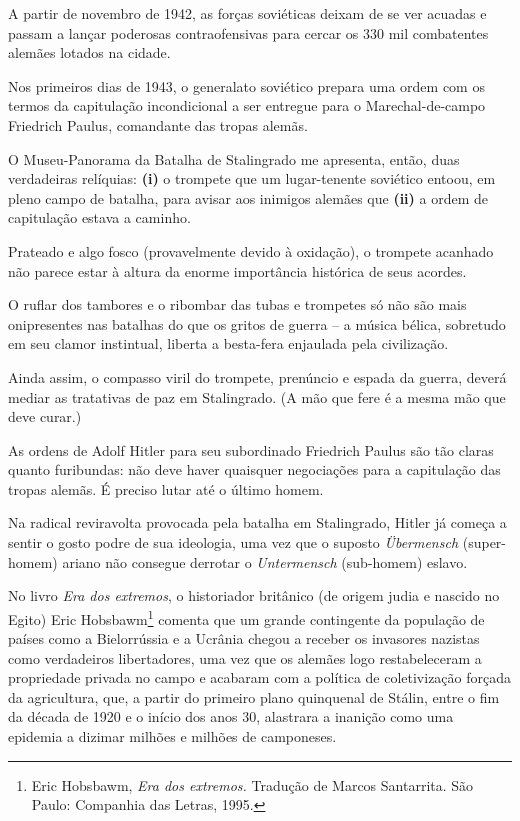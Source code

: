 A partir de novembro de 1942, as forças soviéticas deixam de se ver
acuadas e passam a lançar poderosas contraofensivas para cercar os 330
mil combatentes alemães lotados na cidade.

Nos primeiros dias de 1943, o generalato soviético prepara uma ordem com
os termos da capitulação incondicional a ser entregue para o
Marechal-de-campo Friedrich Paulus, comandante das tropas alemãs.

O Museu-Panorama da Batalha de Stalingrado me apresenta, então, duas
verdadeiras relíquias: \textbf{(i)} o trompete que um lugar-tenente
soviético entoou, em pleno campo de batalha, para avisar aos inimigos
alemães que \textbf{(ii)} a ordem de capitulação estava a caminho.

Prateado e algo fosco (provavelmente devido à oxidação), o trompete
acanhado não parece estar à altura da enorme importância histórica de
seus acordes.

O ruflar dos tambores e o ribombar das tubas e trompetes só não são mais
onipresentes nas batalhas do que os gritos de guerra -- a música bélica,
sobretudo em seu clamor instintual, liberta a besta-fera enjaulada pela
civilização.

Ainda assim, o compasso viril do trompete, prenúncio e espada da guerra,
deverá mediar as tratativas de paz em Stalingrado. (A mão que fere é a
mesma mão que deve curar.)

As ordens de Adolf Hitler para seu subordinado Friedrich Paulus são tão
claras quanto furibundas: não deve haver quaisquer negociações para a
capitulação das tropas alemãs. É preciso lutar até o último homem.

Na radical reviravolta provocada pela batalha em Stalingrado, Hitler já
começa a sentir o gosto podre de sua ideologia, uma vez que o suposto
\emph{Übermensch} (super-homem) ariano não consegue derrotar o
\emph{Untermensch} (sub-homem) eslavo.

No livro \emph{Era dos extremos}, o historiador britânico (de origem
judia e nascido no Egito) Eric Hobsbawm\footnote{Eric Hobsbawm,
  \emph{Era dos extremos.} Tradução de Marcos Santarrita. São Paulo:
  Companhia das Letras, 1995.} comenta que um grande contingente da
população de países como a Bielorrússia e a Ucrânia chegou a receber os
invasores nazistas como verdadeiros libertadores, uma vez que os alemães
logo restabeleceram a propriedade privada no campo e acabaram com a
política de coletivização forçada da agricultura, que, a partir do
primeiro plano quinquenal de Stálin, entre o fim da década de 1920 e o
início dos anos 30, alastrara a inanição como uma epidemia a dizimar
milhões e milhões de camponeses.


